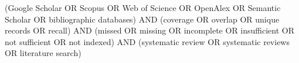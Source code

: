 \begin{description}[style=nextline,font=\normalfont\bfseries]
\item[q3y, counter query] {\footnotesize\ttfamily\raggedright (\textquotedbl{}Google Scholar\textquotedbl{} OR Scopus OR \textquotedbl{}Web of Science\textquotedbl{} OR OpenAlex OR \textquotedbl{}Semantic Scholar\textquotedbl{} OR \textquotedbl{}bibliographic databases\textquotedbl{}) AND (coverage OR overlap OR \textquotedbl{}unique records\textquotedbl{} OR recall) AND (missed OR missing OR incomplete OR insufficient OR \textquotedbl{}not sufficient\textquotedbl{} OR \textquotedbl{}not indexed\textquotedbl{}) AND (\textquotedbl{}systematic review\textquotedbl{} OR \textquotedbl{}systematic reviews\textquotedbl{} OR \textquotedbl{}literature search\textquotedbl{})\par}
\end{description}
